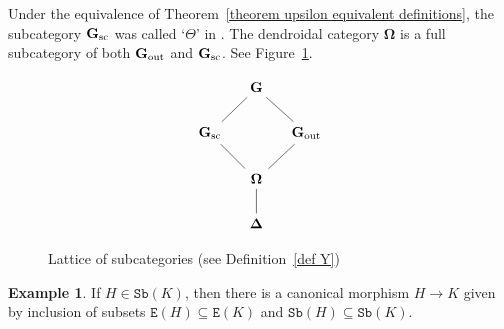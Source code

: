 \documentclass{amsart}
\numberwithin{theorem}{subsection}
\theoremstyle{definition}
\newtheorem{example}[theorem]{Example}
\newcommand{\name}[1]{\ensuremath{\text{\textup{#1}}}}
\newcommand{\simp}{\mathbf{\Delta}}
\newcommand{\bbO}{\mathbf{\Omega}}
\newcommand{\bbY}{\mathbf{G}}
\newcommand{\bbYout}{\bbY_{\name{out}}}
\newcommand{\sub}{\mathtt{Sb}}
\newcommand{\edge}{\mathtt{E}}
\begin{document}
Under the equivalence of Theorem~\ref{theorem upsilon equivalent definitions}, the subcategory $\bbY_{\name{sc}}$ was called `$\Theta$' in \cite{hrybook}.
The dendroidal category $\bbO$ is a full subcategory of both $\bbYout$ and $\bbY_{\name{sc}}$.
See Figure~\ref{figure lattice of subcategories for bbY}.

\begin{figure}
\[ \begin{tikzcd}[column sep=small]
& \bbY \arrow[dl, no head] \arrow[dr, no head] & \\
\bbY_{\name{sc}} \arrow[dr, no head] &  & \bbYout \arrow[dl, no head] \\
& \bbO \arrow[d, no head] \\
& \simp
\end{tikzcd} \]
\caption{Lattice of subcategories (see Definition~\ref{def Y})} \label{figure lattice of subcategories for bbY}
\end{figure}

\begin{example}\label{ex inert}
	If $H \in \sub(K)$, then there is a canonical morphism $H \to K$ given by inclusion of subsets $\edge(H) \subseteq \edge(K)$ and $\sub(H) \subseteq \sub(K)$.
\end{example}
\end{document}
